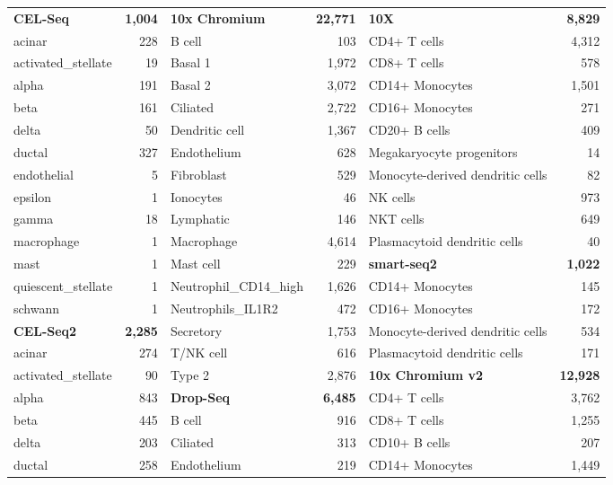 \documentclass[11pt, a4paper]{article}
\begin{document}
\begin{xltabular}{\textwidth}{>{\raggedright\arraybackslash}X r >{\raggedright\arraybackslash}X r >{\raggedright\arraybackslash}X r}
\textbf{CEL-Seq} & \textbf{1,004} & \textbf{10x Chromium} & \textbf{22,771} & \textbf{10X} & \textbf{8,829} \\
\quad acinar & 228 & \quad B cell & 103 & \quad CD4+ T cells & 4,312 \\
\quad activated\_stellate & 19 & \quad Basal 1 & 1,972 & \quad CD8+ T cells & 578 \\
\quad alpha & 191 & \quad Basal 2 & 3,072 & \quad CD14+ Monocytes & 1,501 \\
\quad beta & 161 & \quad Ciliated & 2,722 & \quad CD16+ Monocytes & 271 \\
\quad delta & 50 & \quad Dendritic cell & 1,367 & \quad CD20+ B cells & 409 \\
\quad ductal & 327 & \quad Endothelium & 628 & \quad Megakaryocyte progenitors & 14 \\
\quad endothelial & 5 & \quad Fibroblast & 529 & \quad Monocyte-derived dendritic cells & 82 \\
\quad epsilon & 1 & \quad Ionocytes & 46 & \quad NK cells & 973 \\
\quad gamma & 18 & \quad Lymphatic & 146 & \quad NKT cells & 649 \\
\quad macrophage & 1 & \quad Macrophage & 4,614 & \quad Plasmacytoid dendritic cells & 40 \\
\quad mast & 1 & \quad Mast cell & 229 & \textbf{smart-seq2} & \textbf{1,022} \\
\quad quiescent\_stellate & 1 & \quad Neutrophil\_CD14\_high & 1,626 & \quad CD14+ Monocytes & 145 \\
\quad schwann & 1 & \quad Neutrophils\_IL1R2 & 472 & \quad CD16+ Monocytes & 172 \\
\textbf{CEL-Seq2} & \textbf{2,285} & \quad Secretory & 1,753 & \quad Monocyte-derived dendritic cells & 534 \\
\quad acinar & 274 & \quad T/NK cell & 616 & \quad Plasmacytoid dendritic cells & 171 \\
\quad activated\_stellate & 90 & \quad Type 2 & 2,876 & \textbf{10x Chromium v2} & \textbf{12,928} \\
\quad alpha & 843 & \textbf{Drop-Seq} & \textbf{6,485} & \quad CD4+ T cells & 3,762 \\
\quad beta & 445 & \quad B cell & 916 & \quad CD8+ T cells & 1,255 \\
\quad delta & 203 & \quad Ciliated & 313 & \quad CD10+ B cells & 207 \\
\quad ductal & 258 & \quad Endothelium & 219 & \quad CD14+ Monocytes & 1,449 \\

\end{xltabular}
\end{document}
